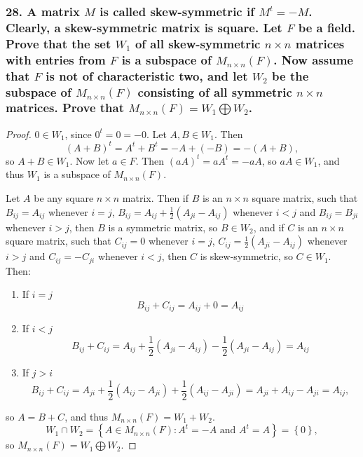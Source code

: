 \documentclass{article}
\begin{document}
\subsubsection*{28. A matrix $M$ is called \textbf{skew-symmetric} if $M^t = -M$. Clearly, a skew-symmetric matrix is square. Let $F$ be a field. Prove that the set $W_1$ of all skew-symmetric $n \times n$ matrices with entries from $F$ is a subspace of $M_{n\times n}(F)$. Now assume that $F$ is not of characteristic two, and let $W_2$ be the subspace of $M_{n\times n}(F)$ consisting of all symmetric $n \times n$ matrices. Prove that $M_{n \times n}(F) = W_1 \bigoplus W_2$.}
\begin{proof}
	$0 \in W_1$, since $0^t = 0 = -0$. Let $A, B \in W_1$. Then \[(A + B)^t = A^t + B^t = -A + (-B) = -(A + B),\] so $A + B \in W_1$. Now let $a \in F$. Then $(aA)^t = aA^t = -aA$, so $aA \in W_1$, and thus $W_1$ is a subspace of $M_{n \times n}(F)$.

	Let $A$ be any square $n \times n$ matrix. Then if $B$ is an $n \times n$ square matrix, such that $B_{ij} = A_{ij}$ whenever $i = j$, $B_{ij} = A_{ij} + \frac{1}{2}(A_{ji} - A_{ij})$ whenever $i < j$ and $B_{ij} = B_{ji}$ whenever $i > j$, then $B$ is a symmetric matrix, so $B \in W_2$, and if $C$ is an $n \times n$ square matrix, such that $C_{ij} = 0$ whenever $i = j$, $C_{ij} = \frac{1}{2}(A_{ji} - A_{ij})$ whenever $i > j$ and $C_{ij} = -C_{ji}$ whenever $i < j$, then $C$ is skew-symmetric, so $C \in W_1$. Then:
	\begin{enumerate}
		\item If $i = j$ \[ B_{ij} + C_{ij} = A_{ij} + 0 = A_{ij} \]
		\item If $i < j$ \[ B_{ij} + C_{ij} = A_{ij} + \frac{1}{2}(A_{ji} - A_{ij}) - \frac{1}{2}(A_{ji} - A_{ij}) = A_{ij} \]
		\item If $j > i$ \[ B_{ij} + C_{ij} = A_{ji} + \frac{1}{2}(A_{ij} - A_{ji}) + \frac{1}{2}(A_{ij} - A_{ji}) = A_{ji} + A_{ij} - A_{ji} = A_{ij}, \]
	\end{enumerate}
	so $A = B + C$, and thus $M_{n \times n}(F) = W_1 + W_2$.
	\[ W_1 \cap W_2 = \left\{A \in M_{n \times n}(F): A^t = -A \text{ and } A^t = A\right\} = \left\{0\right\}, \] so $M_{n \times n}(F) = W_1 \bigoplus W_2$.
\end{proof}
\end{document}
